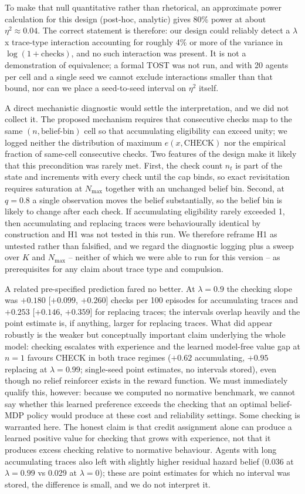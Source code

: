\documentclass[11pt,a4paper]{article}
\begin{document}
To make that null quantitative rather than rhetorical, an approximate power calculation for this design (post-hoc, analytic) gives 80\% power at about $\eta^2 \approx 0.04$. The correct statement is therefore: our design could reliably detect a $\lambda$ x trace-type interaction accounting for roughly 4\% or more of the variance in $\log(1+\text{checks})$, and no such interaction was present. It is not a demonstration of equivalence; a formal TOST was not run, and with 20 agents per cell and a single seed we cannot exclude interactions smaller than that bound, nor can we place a seed-to-seed interval on $\eta^2$ itself.

A direct mechanistic diagnostic would settle the interpretation, and we did not collect it. The proposed mechanism requires that consecutive checks map to the same $(n, \text{belief-bin})$ cell so that accumulating eligibility can exceed unity; we logged neither the distribution of maximum $e(x,\mathrm{CHECK})$ nor the empirical fraction of same-cell consecutive checks. Two features of the design make it likely that this precondition was rarely met. First, the check count $n_t$ is part of the state and increments with every check until the cap binds, so exact revisitation requires saturation at $N_{\max}$ together with an unchanged belief bin. Second, at $q=0.8$ a single observation moves the belief substantially, so the belief bin is likely to change after each check. If accumulating eligibility rarely exceeded 1, then accumulating and replacing traces were behaviourally identical by construction and H1 was not tested in this run. We therefore reframe H1 as untested rather than falsified, and we regard the diagnostic logging plus a sweep over $K$ and $N_{\max}$ -- neither of which we were able to run for this version -- as prerequisites for any claim about trace type and compulsion.

A related pre-specified prediction fared no better. At $\lambda=0.9$ the checking slope was $+0.180$ [$+0.099$, $+0.260$] checks per 100 episodes for accumulating traces and $+0.253$ [$+0.146$, $+0.359$] for replacing traces; the intervals overlap heavily and the point estimate is, if anything, larger for replacing traces. What did appear robustly is the weaker but conceptually important claim underlying the whole model: checking escalates with experience and the learned model-free value gap at $n=1$ favours CHECK in both trace regimes ($+0.62$ accumulating, $+0.95$ replacing at $\lambda=0.99$; single-seed point estimates, no intervals stored), even though no relief reinforcer exists in the reward function. We must immediately qualify this, however: because we computed no normative benchmark, we cannot say whether this learned preference exceeds the checking that an optimal belief-MDP policy would produce at these cost and reliability settings. Some checking is warranted here. The honest claim is that credit assignment alone can produce a learned positive value for checking that grows with experience, not that it produces excess checking relative to normative behaviour. Agents with long accumulating traces also left with slightly higher residual hazard belief (0.036 at $\lambda=0.99$ vs 0.029 at $\lambda=0$); these are point estimates for which no interval was stored, the difference is small, and we do not interpret it.
\end{document}
